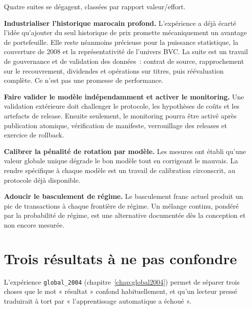 Quatre suites se dégagent, classées par rapport valeur/effort.

\textbf{Industrialiser l'historique marocain profond.} L'expérience a déjà écarté
l'idée qu'ajouter du seul historique de prix promette mécaniquement un avantage
de portefeuille. Elle reste néanmoins précieuse pour la puissance statistique,
la couverture de 2008 et la représentativité de l'univers BVC. La suite est un
travail de gouvernance et de validation des données~: contrat de source,
rapprochement sur le recouvrement, dividendes et opérations sur titres, puis
réévaluation complète. Ce n'est pas une promesse de performance.

\textbf{Faire valider le modèle indépendamment et activer le monitoring.} Une
validation extérieure doit challenger le protocole, les hypothèses de coûts et
les artefacts de release. Ensuite seulement, le monitoring pourra être activé
après publication atomique, vérification de manifeste, verrouillage des releases
et exercice de rollback.

\textbf{Calibrer la pénalité de rotation par modèle.} Les mesures ont établi
qu'une valeur globale unique dégrade le bon modèle tout en corrigeant le mauvais.
La rendre spécifique à chaque modèle est un travail de calibration circonscrit,
au protocole déjà disponible.

\textbf{Adoucir le basculement de régime.} Le basculement franc actuel produit un
pic de transactions à chaque frontière de régime. Un mélange continu, pondéré par
la probabilité de régime, est une alternative documentée dès la conception et non
encore mesurée.

\section*{Trois résultats à ne pas confondre}

L'expérience \texttt{global\_2004} (chapitre~\ref{chap:global2004}) permet de
séparer trois choses que le mot « résultat » confond habituellement, et qu'un
lecteur pressé traduirait à tort par « l'apprentissage automatique a échoué ».

